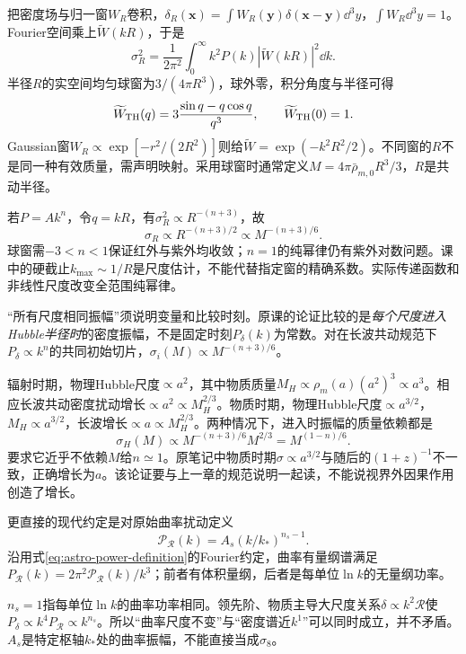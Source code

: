 把密度场与归一窗$W_R$卷积，$\delta_R(\mathbf x)=\int W_R(\mathbf y)\delta(\mathbf x-\mathbf y)\dd^3y$，$\int W_R\dd^3y=1$。Fourier空间乘上$\widetilde W(kR)$，于是
\begin{equation}\label{eq:astro-smoothed-variance}
 \sigma_R^2=\frac1{2\pi^2}\int_0^\infty k^2P(k)|\widetilde W(kR)|^2\dd k.
\end{equation}
半径$R$的实空间均匀球窗为$3/(4\pi R^3)$，球外零，积分角度与半径可得
\[
 \widetilde W_{ \rm TH}(q)=3\frac{\sin q-q\cos q}{q^3},\qquad
 \widetilde W_{ \rm TH}(0)=1.
\]
Gaussian窗$W_R\propto\exp[-r^2/(2R^2)]$则给$\widetilde W=\exp(-k^2R^2/2)$。不同窗的$R$不是同一种有效质量，需声明映射。采用球窗时通常定义$M=4\pi\bar\rho_{m,0}R^3/3$，$R$是共动半径。

若$P=Ak^n$，令$q=kR$，有$\sigma_R^2\propto R^{-(n+3)}$，故
\[
 \sigma_R\propto R^{-(n+3)/2}\propto M^{-(n+3)/6}.
\]
球窗需$-3<n<1$保证红外与紫外均收敛；$n=1$的纯幂律仍有紫外对数问题。课中的硬截止$k_{\max}\sim1/R$是尺度估计，不能代替指定窗的精确系数。实际传递函数和非线性尺度改变全范围纯幂律。

“所有尺度相同振幅”须说明变量和比较时刻。原课的论证比较的是\emph{每个尺度进入Hubble半径时}的密度振幅，不是固定时刻$P_\delta(k)$为常数。对在长波共动规范下$P_\delta\propto k^n$的共同初始切片，$\sigma_i(M)\propto M^{-(n+3)/6}$。

辐射时期，物理Hubble尺度$\propto a^2$，其中物质质量$M_H\propto\rho_m(a)(a^2)^3\propto a^3$。相应长波共动密度扰动增长$\propto a^2\propto M_H^{2/3}$。物质时期，物理Hubble尺度$\propto a^{3/2}$，$M_H\propto a^{3/2}$，长波增长$\propto a\propto M_H^{2/3}$。两种情况下，进入时振幅的质量依赖都是
\[
 \sigma_H(M)\propto M^{-(n+3)/6}M^{2/3}=M^{(1-n)/6}.
\]
要求它近乎不依赖$M$给$n\simeq1$。原笔记中物质时期$\sigma\propto a^{3/2}$与随后的$(1+z)^{-1}$不一致，正确增长为$a$。该论证要与上一章的规范说明一起读，不能说视界外因果作用创造了增长。

更直接的现代约定是对原始曲率扰动定义
\[
 \mathcal P_{\mathcal R}(k)=A_s(k/k_*)^{n_s-1}.
\]
沿用式\eqref{eq:astro-power-definition}的Fourier约定，曲率有量纲谱满足$P_{\mathcal R}(k)=2\pi^2\mathcal P_{\mathcal R}(k)/k^3$；前者有体积量纲，后者是每单位$\ln k$的无量纲功率。

$n_s=1$指每单位$\ln k$的曲率功率相同。领先阶、物质主导大尺度关系$\delta\propto k^2\mathcal R$使$P_\delta\propto k^4P_\mathcal R\propto k^{n_s}$。所以“曲率尺度不变”与“密度谱近$k^1$”可以同时成立，并不矛盾。$A_s$是特定枢轴$k_*$处的曲率振幅，不能直接当成$\sigma_8$。


